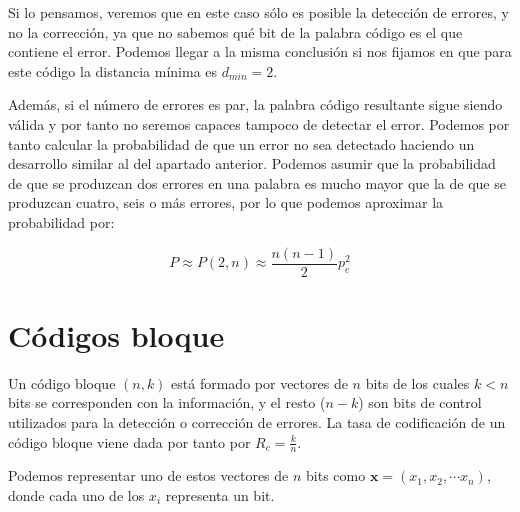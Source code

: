 \documentclass[es,apuntes]{uah}
\begin{document}
Si lo pensamos, veremos que en este caso sólo es posible la detección de errores, y no la corrección, ya que no sabemos qué bit de la palabra código es el que contiene el error. Podemos llegar a la misma conclusión si nos fijamos en que para este código la distancia mínima es $d_{min} = 2$.

Además, si el número de errores es par, la palabra código resultante sigue siendo válida y por tanto no seremos capaces tampoco de detectar el error. Podemos por tanto calcular la probabilidad de que un error no sea detectado haciendo un desarrollo similar al del apartado anterior. Podemos asumir que la probabilidad de que se produzcan dos errores en una palabra es mucho mayor que la de que se produzcan cuatro, seis o más errores, por lo que podemos aproximar la probabilidad por:

\begin{displaymath}
	P \approx P(2,n) \approx \frac{n(n-1)}{2} p_e^2
\end{displaymath}

%





\section{Códigos bloque}

Un código bloque $(n,k)$ está formado por vectores de $n$ bits de los cuales $k<n$ bits se corresponden con la información, y el resto ($n-k$) son bits de control utilizados para la detección o corrección de errores. La tasa de codificación de un código bloque viene dada por tanto por $R_c = \frac{k}{n}$.

Podemos representar uno de estos vectores de $n$ bits como $\mathbf{x} = (x_1, x_2, \cdots x_n)$, donde cada uno de los $x_i$ representa un bit. 
\end{document}
